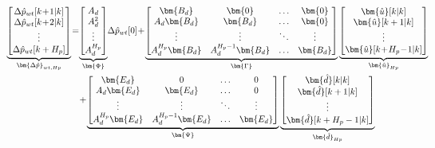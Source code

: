\begin{align}\hspace{-0.8cm}
\underbrace{\begin{bmatrix}
\Delta \hat p_{wt}[k\!+\!1|k] \\ 
\Delta \hat p_{wt}[k\!+\!2|k]\\ 
\vdots \\ 
\Delta \hat p_{wt}[k+H_p]\\ 
\end{bmatrix}}_{\bm{\Delta \hat{p}}_{wt,Hp}}
\!=\!
&\underbrace{\begin{bmatrix}
A_d \\ 
A_d^2\\ 
\vdots \\ 
A_d^{H_p}\\ 
\end{bmatrix}}_{\bm{\Phi}}
\! \Delta \hat{p}_{wt}[0]\!+\!\nonumber
\underbrace{\begin{bmatrix}
 \bm{B_d}         & \bm{0}                &\hdots & \bm{0}\\ 
 A_d\bm{B_d}      &  \bm{B_d}             &\hdots & \bm{0}\\ 
\vdots            &\vdots                 &\ddots  & \vdots\\ 
 A_d^{H_p}\bm{B_d}& A_d^{H_p-1}\bm{B_d}   &\hdots & \bm{B_d}
\end{bmatrix}}_{\bm{\Gamma}}
\underbrace{\begin{bmatrix}
 \bm{\hat{u}}[k|k] \\ 
 \bm{\hat{u}}[k+1|k]\\ 
\vdots \\ 
 \bm{\hat{u}}[k\!+\!H_p\!-\!1|k]\\ 
\end{bmatrix}}_{\bm{\hat{u}}_{Hp}} \\
\!\!&+\! 
\underbrace{\begin{bmatrix}
 \bm{E_d}& 0 & \hdots  & 0\\ 
 A_d\bm{E_d}&  \bm{E_d}& \hdots & 0\\ 
\vdots &\vdots  & \ddots  & \vdots\\ 
 A_d^{H_p}\bm{E_d}& A_d^{H_p-1}\bm{E_d}  & \hdots  & \bm{E_d}
\end{bmatrix}}_{\bm{\Psi}}
\underbrace{\begin{bmatrix}
 \bm{\hat{d}}[k|k] \\ 
 \bm{\hat{d}}[k+1|k]\\ 
\vdots \\ 
 \bm{\hat{d}}[k+H_p-1|k]\\ 
\end{bmatrix}}_{\bm{\hat{d}}_{Hp}} 
\end{align}

